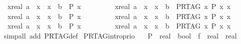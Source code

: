 \begin{isabellebody}
\ \ {\isachardoublequoteopen}{\isacharparenleft}{\isasymforall}x{\isacharcolon}{\isacharcolon}real{\isachardot}\ a\ {\isasymle}\ x\ {\isasymand}\ x\ {\isasymle}\ b\ {\isasymlongrightarrow}\ P\ x{\isacharparenright}\ {\isacharequal}\ \isanewline
\ \ \ \ \ \ \ {\isacharparenleft}{\isasymforall}x{\isacharcolon}{\isacharcolon}real{\isachardot}\ a\ {\isasymle}\ x\ {\isasymand}\ x\ {\isasymle}\ b\ {\isasymlongrightarrow}\ {\isasymnot}{\isacharparenleft}PR{\isacharunderscore}TAG\ {\isacharparenleft}{\isasymlambda}x{\isachardot}\ {\isasymnot}P\ x{\isacharparenright}{\isacharparenright}\ x{\isacharparenright}{\isachardoublequoteclose}\isanewline
\ \ {\isachardoublequoteopen}{\isacharparenleft}{\isasymforall}x{\isacharcolon}{\isacharcolon}real{\isachardot}\ a\ {\isasymle}\ x\ {\isasymand}\ x\ {\isacharless}\ b\ {\isasymlongrightarrow}\ P\ x{\isacharparenright}\ {\isacharequal}\ \isanewline
\ \ \ \ \ \ \ {\isacharparenleft}{\isasymforall}x{\isacharcolon}{\isacharcolon}real{\isachardot}\ a\ {\isasymle}\ x\ {\isasymand}\ x\ {\isacharless}\ b\ {\isasymlongrightarrow}\ {\isasymnot}{\isacharparenleft}PR{\isacharunderscore}TAG\ {\isacharparenleft}{\isasymlambda}x{\isachardot}\ {\isasymnot}P\ x{\isacharparenright}{\isacharparenright}\ x{\isacharparenright}{\isachardoublequoteclose}\isanewline
\ \ {\isachardoublequoteopen}{\isacharparenleft}{\isasymforall}x{\isacharcolon}{\isacharcolon}real{\isachardot}\ a\ {\isacharless}\ x\ {\isasymand}\ x\ {\isacharless}\ b\ {\isasymlongrightarrow}\ P\ x{\isacharparenright}\ {\isacharequal}\ \isanewline
\ \ \ \ \ \ \ {\isacharparenleft}{\isasymforall}x{\isacharcolon}{\isacharcolon}real{\isachardot}\ a\ {\isacharless}\ x\ {\isasymand}\ x\ {\isacharless}\ b\ {\isasymlongrightarrow}\ {\isasymnot}{\isacharparenleft}PR{\isacharunderscore}TAG\ {\isacharparenleft}{\isasymlambda}x{\isachardot}\ {\isasymnot}P\ x{\isacharparenright}{\isacharparenright}\ x{\isacharparenright}{\isachardoublequoteclose}\isanewline
%
\isadelimproof
\ \ %
\endisadelimproof
%
\isatagproof
{}\isamarkupfalse%
\ {\isacharparenleft}simp{\isacharunderscore}all\ add{\isacharcolon}\ PR{\isacharunderscore}TAG{\isacharunderscore}def{\isacharparenright}%
\endisatagproof
{\isafoldproof}%
%
\isadelimproof
\isanewline
%
\endisadelimproof
\isanewline
\isanewline
\isanewline
{}\isamarkupfalse%
\ PR{\isacharunderscore}TAG{\isacharunderscore}intro{\isacharunderscore}prio{}{\isacharcolon}\isanewline
\ \ \ P\ {\isacharcolon}{\isacharcolon}\ {\isachardoublequoteopen}real\ {\isasymRightarrow}\ bool{\isachardoublequoteclose}\ \ f\ {\isacharcolon}{\isacharcolon}\ {\isachardoublequoteopen}real\ {\isasymRightarrow}\ real{\isachardoublequoteclose}\isanewline

\end{isabellebody}
